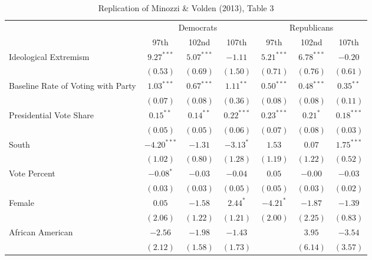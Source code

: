 \documentclass[12pt]{article}
\begin{document}
\begin{table}
	\begin{center}
		\caption{Replication of Minozzi \& Volden (2013), Table 3}
		\begin{tabular}{l c c c c c c }
			\hline
			& \multicolumn{3}{c}{Democrats} & \multicolumn{3}{c}{Republicans} \\
			\cline{2-7}
			& 97th & 102nd & 107th & 97th & 102nd & 107th \\
			\hline
			Ideological Extremism & $9.27^{***}$  & $5.07^{***}$  & $-1.11$      & $5.21^{***}$ & $6.78^{***}$  & $-0.20$       \\
			& $(0.53)$      & $(0.69)$      & $(1.50)$     & $(0.71)$     & $(0.76)$      & $(0.61)$      \\
			Baseline Rate of Voting with Party              & $1.03^{***}$  & $0.67^{***}$  & $1.11^{**}$  & $0.50^{***}$ & $0.48^{***}$  & $0.35^{**}$   \\
			& $(0.07)$      & $(0.08)$      & $(0.36)$     & $(0.08)$     & $(0.08)$      & $(0.11)$      \\
			Presidential Vote Share          & $0.15^{**}$   & $0.14^{**}$   & $0.22^{***}$ & $0.23^{***}$ & $0.21^{*}$    & $0.18^{***}$  \\
			& $(0.05)$      & $(0.05)$      & $(0.06)$     & $(0.07)$     & $(0.08)$      & $(0.03)$      \\
			South                  & $-4.20^{***}$ & $-1.31$       & $-3.13^{*}$  & $1.53$       & $0.07$        & $1.75^{***}$  \\
			& $(1.02)$      & $(0.80)$      & $(1.28)$     & $(1.19)$     & $(1.22)$      & $(0.52)$      \\
			Vote Percent                & $-0.08^{*}$   & $-0.03$       & $-0.04$      & $0.05$       & $-0.00$       & $-0.03$       \\
			& $(0.03)$      & $(0.03)$      & $(0.05)$     & $(0.05)$     & $(0.03)$      & $(0.02)$      \\
			Female                 & $0.05$        & $-1.58$       & $2.44^{*}$   & $-4.21^{*}$  & $-1.87$       & $-1.39$       \\
			& $(2.06)$      & $(1.22)$      & $(1.21)$     & $(2.00)$     & $(2.25)$      & $(0.83)$      \\
			African American                   & $-2.56$       & $-1.98$       & $-1.43$      &              & $3.95$        & $-3.54$       \\
			& $(2.12)$      & $(1.58)$      & $(1.73)$     &              & $(6.14)$      & $(3.57)$      \\

\end{tabular}
\end{center}
\end{table}
\end{document}
